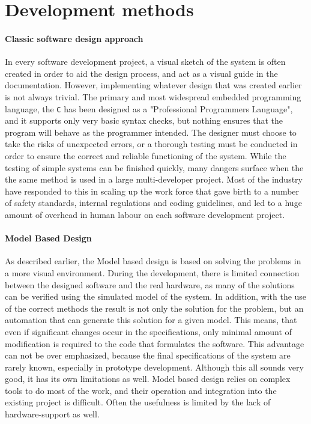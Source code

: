 \section{Development methods}

\paragraph{Classic software design approach}

In every software development project, a visual sketch of the system is often created in order to aid the design process, and act as a visual guide in the documentation. However, implementing whatever design that was created earlier is not always trivial. The primary and most widespread embedded programming language, the \verb!C! has been designed as a "Professional Programmers Language", and it supports only very basic syntax checks, but nothing ensures that the program will behave as the programmer intended. The designer must choose to take the risks of unexpected errors, or a thorough testing must be conducted in order to ensure the correct and reliable functioning of the system. While the testing of simple systems can be finished quickly, many dangers surface when the the same method is used in a large multi-developer project. Most of the industry have responded to this in scaling up the work force that gave birth to a number of safety standards, internal regulations and coding guidelines\cite{misra}, and led to a huge amount of overhead in human labour on each software development project.

\paragraph{Model Based Design}

As described earlier, the Model based design is based on solving the problems in a more visual environment. During the development, there is  limited connection between the designed software and the real hardware, as many of the solutions can be verified using the simulated model of the system.
In addition, with the use of the correct methods the result is not only the solution for the problem, but an automation that can generate this solution for a given model. This means, that even if significant changes occur in the specifications, only minimal amount of modification is required to the code that formulates the software. This advantage can not be over emphasized, because the final specifications of the system are rarely known, especially in prototype development.
Although this all sounds very good, it has its own limitations as well. Model based design relies on complex tools to do most of the work, and their operation and integration into the existing project is difficult. Often the usefulness is limited by the lack of hardware-support as well.

